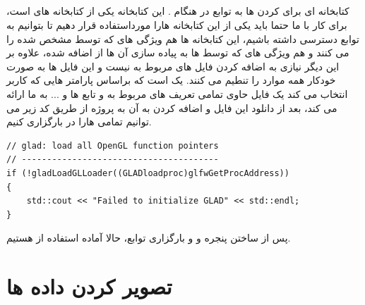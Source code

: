 \documentclass[a4paper, 12pt]{book}
\newcommand{\lrit}[1]{\lr{\textit{#1}}}
\begin{document}
\subsection*{}
\noindent
\normalsize
    کتابخانه ای برای \lrit{load} کردن  ها به توابع  در هنگام .
    این کتابخانه یکی از کتابخانه های است، برای کار با  ما حتما باید یکی از این کتابخانه هارا مورداستفاده قرار دهیم تا بتوانیم به توابع  دسترسی داشته باشیم، این کتابخانه ها هم ویژگی های  که توسط  مشخص شده را  می کنند و هم ویژگی های  که توسط  ها به پیاده سازی آن ها از  اضافه شده، علاوه بر این دیگر نیازی به اضافه کردن فایل های مربوط به  نیست و این فایل ها به صورت خودکار همه موارد را تنطیم می کنند.
     یک  است که براساس پارامتر هایی که کاربر انتخاب می کند یک فایل حاوی تمامی تعریف های مربوط به  و تابع ها و ... به ما ارائه می کند، بعد از دانلود این فایل و اضافه کردن به آن به پروژه از طریق کد زیر می توانیم تمامی  هارا در  بارگزاری کنیم.

    \begin{LTR}
        \small
        \begin{lstlisting}[style=C++Style,caption=\lrit{load opengl function pointer}]
// glad: load all OpenGL function pointers
// ---------------------------------------
if (!gladLoadGLLoader((GLADloadproc)glfwGetProcAddress))
{
    std::cout << "Failed to initialize GLAD" << std::endl;
}
        \end{lstlisting}
    \end{LTR}
    \normalsize
    \vspace*{0.3cm}
    پس از ساختن پنجره و  و بارگزاری توابع، حالا آماده استفاده از  هستیم.





\section*{\huge{تصویر کردن داده ها}}
\vspace*{0.6cm}
\end{document}
